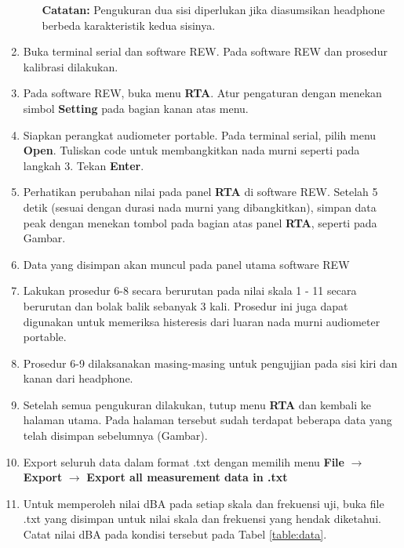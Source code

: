\documentclass{article}
\begin{document}
\begin{enumerate}
\begin{itemize}
			\textbf{Catatan:} Pengukuran dua sisi diperlukan jika diasumsikan headphone berbeda karakteristik kedua sisinya.
		\end{itemize}
		
		\item Buka terminal serial dan software REW. Pada software REW dan prosedur kalibrasi dilakukan.
		
		\item Pada software REW, buka menu {\bf RTA}. Atur pengaturan dengan menekan simbol {\bf Setting} pada bagian kanan atas menu.
		
		\item Siapkan perangkat audiometer portable. Pada terminal serial, pilih menu {\bf Open}. Tuliskan code untuk membangkitkan nada murni seperti pada langkah 3. Tekan {\bf Enter}.
		
		\item Perhatikan perubahan nilai pada panel {\bf RTA} di software REW. Setelah 5 detik (sesuai dengan durasi nada murni yang dibangkitkan), simpan data peak dengan menekan tombol pada bagian atas panel {\bf RTA}, seperti pada Gambar.
		
		\item Data yang disimpan akan muncul pada panel utama software REW
		
		\item Lakukan prosedur 6-8 secara berurutan pada nilai skala 1 - 11 secara berurutan dan bolak balik sebanyak 3 kali. Prosedur ini juga dapat digunakan untuk memeriksa histeresis dari luaran nada murni audiometer portable. 
		
		\item Prosedur 6-9 dilaksanakan masing-masing untuk pengujjian pada sisi kiri dan kanan dari headphone.
		
		\item Setelah semua pengukuran dilakukan, tutup menu {\bf RTA} dan kembali ke halaman utama. Pada halaman tersebut sudah terdapat beberapa data yang telah disimpan sebelumnya (Gambar).
		
		\item Export seluruh data dalam format .txt dengan memilih menu {\bf File} $\rightarrow$ {\bf Export}  $\rightarrow$ {\bf Export all measurement data in .txt}
		
		\item Untuk memperoleh nilai dBA pada setiap skala dan frekuensi uji, buka file .txt yang disimpan untuk nilai skala dan frekuensi yang hendak diketahui. Catat nilai dBA pada kondisi tersebut pada Tabel \ref{table:data}.
		

\end{enumerate}
\end{document}
